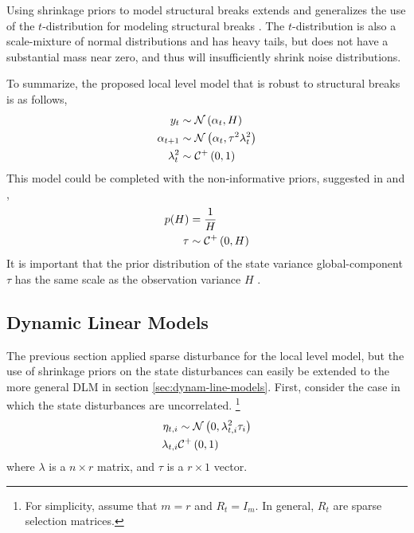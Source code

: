 \documentclass{article}
\begin{document}
Using shrinkage priors to model structural breaks extends and generalizes the use of the $t$-distribution for modeling structural breaks \parencites{HarveyKoopman2000}[184][]{DurbinKoopman2001}{PetrisPetroneEtAl2009}.
The $t$-distribution is also a scale-mixture of normal distributions and has heavy tails, but does not have a substantial mass near zero, and thus will insufficiently shrink noise distributions.

To summarize, the proposed local level model that is robust to structural breaks is as follows,
\begin{equation}
  \label{eq:10}
  \begin{aligned}[t]
    y_{t} &\sim \mathcal{N}\left(\alpha_{t}, H\right) \\
    \alpha_{t + 1} &\sim \mathcal{N}\left(\alpha_{t}, \tau^{2} \lambda^{2}_{t}\right) \\
    \lambda^{2}_{t} & \sim \mathcal{C}^{+}\left(0, 1\right)
  \end{aligned}
\end{equation}
This model could be completed with the non-informative priors, suggested in \textcite{CarvalhoPolsonScott2009} and \textcite{PolsonScott2010},
\begin{equation}
  \label{eq:7}
  \begin{aligned}[t]
    p(H) &= \frac{1}{H} \\
    \tau &\sim \mathcal{C}^{+}\left(0, H\right)
  \end{aligned}
\end{equation}
It is important that the prior distribution of the state variance global-component $\tau$ has the same scale as the observation variance $H$ \parencite{PolsonScott2012}.

\subsection{Dynamic Linear Models}
\label{sec:multivariate}

The previous section applied sparse disturbance for the local level model, but the use of shrinkage priors on the state disturbances can easily be extended to the more general DLM in section \ref{sec:dynam-line-models}.
First, consider the case in which the state disturbances are uncorrelated.
\footnote{
  For simplicity, assume that $m = r$ and $R_{t} = I_{m}$.
  In general, $R_{t}$ are sparse selection matrices.
}
\begin{equation}
  \label{eq:20}
  \begin{aligned}[t]
    \eta_{t,i} &\sim \mathcal{N}\left(0, \lambda_{t,i}^{2} \tau_{i}\right) \\
    \lambda_{t,i} & \mathcal{C}^{+}\left(0, 1\right)
  \end{aligned}
\end{equation}
where $\lambda$ is a $n \times r$ matrix, and $\tau$ is a $r \times 1$ vector.
\end{document}
